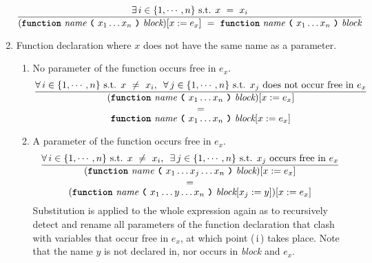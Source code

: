 \begin{enumerate}
    \[
    \frac{
      \exists \, i \in \{1, \cdots, n\} \text{ s.t. } x \ = \ x_i
    }{
      (\textbf{\texttt{function}}\  \textit{name} \ \textbf{\texttt{(}}\ x_1 \ldots x_n \ \textbf{\texttt{)}}\ \textit{block})[x := e_x]
      \ = \ 
      \textbf{\texttt{function}}\  \textit{name} \ \textbf{\texttt{(}}\ x_1 \ldots x_n \ \textbf{\texttt{)}}\ \textit{block}
    }
    \]
    \item Function declaration where $x$ does not have the same name as a parameter.
    \begin{enumerate}
        \item No parameter of the function occurs free in $e_x$.
        \[
        \frac{
          \forall \, i \in \{1, \cdots, n\} \text{ s.t. } x \ \neq \ x_i \text{, } \ \forall \, j \in \{1, \cdots, n\} \text{ s.t. } x_j \text{ does not occur free in $e_x$}
        }{
          \substack{\substack{\displaystyle{(\textbf{\texttt{function}}\  \textit{name} \ \textbf{\texttt{(}}\ x_1 \ldots x_n \ \textbf{\texttt{)}}\ \textit{block})[x := e_x]} \vspace{1.5mm} \\ \vspace{0.5mm} \displaystyle{=}} \\  \displaystyle{ \textbf{\texttt{function}}\  \textit{name} \ \textbf{\texttt{(}}\ x_1 \ldots x_n \ \textbf{\texttt{)}}\ \textit{block}[x := e_x]}}
        }
        \]
        \item A parameter of the function occurs free in $e_x$.
        \[
        \frac{
          \forall \, i \in \{1, \cdots, n\} \text{ s.t. } x \ \neq \ x_i \text{, } \ \exists \, j \in \{1, \cdots, n\} \text{ s.t. } x_j \text{ occurs free in $e_x$}
        }{
          \substack{\substack{\displaystyle{(\textbf{\texttt{function}}\  \textit{name} \ \textbf{\texttt{(}}\ x_1 \ldots x_j \ldots x_n \ \textbf{\texttt{)}}\ \textit{block})[x := e_x]} \vspace{1.5mm} \\ \vspace{0.5mm} \displaystyle{=}} \\  \displaystyle{(\textbf{\texttt{function}}\  \textit{name} \ \textbf{\texttt{(}}\ x_1 \ldots y \ldots x_n \ \textbf{\texttt{)}}\ \textit{block}[x_j := y])[x := e_x]}}
        }
        \]
        Substitution is applied to the whole expression again as to recursively detect and rename all parameters of the function declaration that clash with variables that occur free in $e_x$, at which point (\,i\,) takes place. Note that the name $y$ is not declared in, nor occurs in \textit{block} and $e_x$.
    \end{enumerate}
    \end{enumerate}

